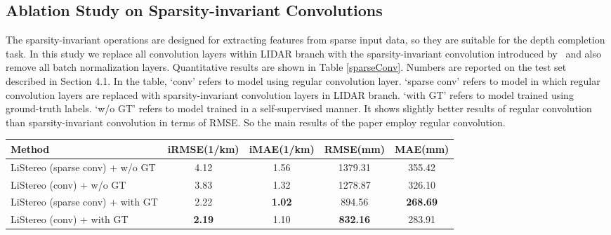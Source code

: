 \documentclass[letterpaper, 10 pt, conference]{ieeeconf}
\begin{document}
\subsection{Ablation Study on Sparsity-invariant Convolutions}
     The sparsity-invariant operations are designed for extracting features from sparse input data, so they are suitable for the depth completion task. In this study we replace all convolution layers within LIDAR branch with the sparsity-invariant convolution introduced by~\cite{sparsityCNN} and also remove all batch normalization layers. Quantitative results are shown in Table \ref{sparseConv}. Numbers are reported on the test set described in Section 4.1. In the table, `conv' refers to model using regular convolution layer. `sparse conv' refers to model in which regular convolution layers are replaced with sparsity-invariant convolution layers in LIDAR branch. `with GT' refers to model trained using ground-truth labels. `w/o GT' refers to model trained in a self-supervised manner. It shows slightly better results of regular convolution than sparsity-invariant convolution in terms of RMSE. So the main results of the paper employ regular convolution. 

    \begin{table*}[t!]
    \begin{center}
    \footnotesize
    \begin{tabular}{|l|c|c|c|c|}
    \hline
    Method  & iRMSE(1/km) & iMAE(1/km) & RMSE(mm) & MAE(mm) \\
\hline\hline
    LiStereo (sparse conv) + w/o GT & 4.12 & 1.56 & 1379.31 & 355.42\\
    LiStereo (conv) + w/o GT & 3.83 & 1.32 & 1278.87 & 326.10\\
    LiStereo (sparse conv) + with GT & 2.22 & \textbf{1.02} & 894.56 & \textbf{268.69}\\
    LiStereo (conv) + with GT & \textbf{2.19} & 1.10 & \textbf{832.16} & 283.91\\
    \hline
    \end{tabular}
    \end{center}
    \caption{Ablation study on regular convolution and sparsity-invariant convolution. All models take stereo images as inputs. `conv' refers to model using regular convolution layer. `sparse conv' refers to model in which regular convolution layers are replaced with sparsity-invariant convolution layers in LIDAR branch. `with GT' refers to model trained using ground-truth label. `w/o GT' refers to model trained in a self-supervised manner. Results are reported on split test set introduced in section 4.1. It shows slightly better results of regular convolution than sparsity-invariant convolution in terms of RMSE.}
    \label{sparseConv}
    \vspace{-5mm}
    \end{table*}
\end{document}
